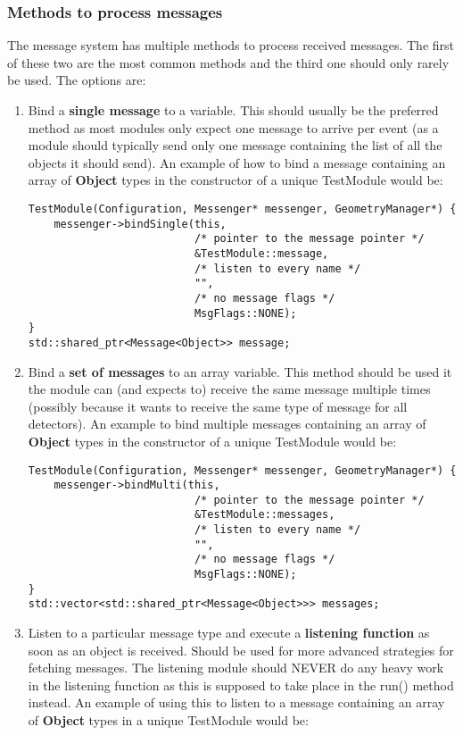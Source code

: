 \subsubsection{Methods to process messages}
The message system has multiple methods to process received messages. The first of these two are the most common methods and the third one should only rarely be used. The options are:
\begin{enumerate}
\item Bind a \textbf{single message} to a variable. This should usually be the preferred method as most modules only expect one message to arrive per event (as a module should typically send only one message containing the list of all the objects it should send). An example of how to bind a message containing an array of \textbf{Object} types in the constructor of a unique TestModule would be:
\begin{verbatim}
TestModule(Configuration, Messenger* messenger, GeometryManager*) {
    messenger->bindSingle(this, 
                          /* pointer to the message pointer */
                          &TestModule::message,
                          /* listen to every name */
                          "",
                          /* no message flags */
                          MsgFlags::NONE);
}
std::shared_ptr<Message<Object>> message;
\end{verbatim}
\item Bind a \textbf{set of messages} to an array variable. This method should be used it the module can (and expects to) receive the same message multiple times (possibly because it wants to receive the same type of message for all detectors). An example to bind multiple messages containing an array of \textbf{Object} types in the constructor of a unique TestModule would be:
\begin{verbatim}
TestModule(Configuration, Messenger* messenger, GeometryManager*) {
    messenger->bindMulti(this,
                          /* pointer to the message pointer */
                          &TestModule::messages,
                          /* listen to every name */
                          "",
                          /* no message flags */
                          MsgFlags::NONE);
}
std::vector<std::shared_ptr<Message<Object>>> messages;
\end{verbatim}
\item Listen to a particular message type and execute a \textbf{listening function} as soon as an object is received. Should be used for more advanced strategies for fetching messages. The listening module should NEVER do any heavy work in the listening function as this is supposed to take place in the run() method instead. An example of using this to listen to a message containing an array of \textbf{Object} types in a unique TestModule would be:

\end{enumerate}
